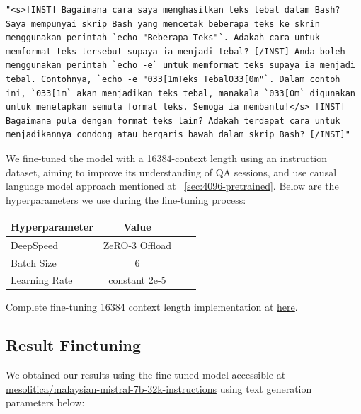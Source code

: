 \documentclass[preprint]{article}
\begin{document}
\begin{lstlisting}[breaklines=true]
"<s>[INST] Bagaimana cara saya menghasilkan teks tebal dalam Bash? Saya mempunyai skrip Bash yang mencetak beberapa teks ke skrin menggunakan perintah `echo "Beberapa Teks"`. Adakah cara untuk memformat teks tersebut supaya ia menjadi tebal? [/INST] Anda boleh menggunakan perintah `echo -e` untuk memformat teks supaya ia menjadi tebal. Contohnya, `echo -e "033[1mTeks Tebal033[0m"`. Dalam contoh ini, `033[1m` akan menjadikan teks tebal, manakala `033[0m` digunakan untuk menetapkan semula format teks. Semoga ia membantu!</s> [INST] Bagaimana pula dengan format teks lain? Adakah terdapat cara untuk menjadikannya condong atau bergaris bawah dalam skrip Bash? [/INST]"
\end{lstlisting}



We fine-tuned the model with a 16384-context length using an instruction dataset, aiming to improve its understanding of QA sessions, and use causal language model approach mentioned at ~\ref{sec:4096-pretrained}. Below are the hyperparameters we use during the fine-tuning process:

\begin{table}[h]
  \centering
  \begin{tabular}{lccl}
    \hline
    \textbf{Hyperparameter} & \textbf{Value} \\
    \hline
    DeepSpeed               & ZeRO-3 Offload \\
    Batch Size              & 6              \\
    Learning Rate           & constant 2e-5  \\

    \hline
  \end{tabular}
\end{table}

Complete fine-tuning 16384 context length implementation at \href{https://github.com/mesolitica/malaya/tree/5.1/session/mistral#instructions-7b-16384-context-length}{here}.

\subsection{Result Finetuning}\label{sec:result-finetuning}

We obtained our results using the fine-tuned model accessible at \href{https://huggingface.co/mesolitica/malaysian-mistral-7b-32k-instructions}{mesolitica/malaysian-mistral-7b-32k-instructions} using text generation parameters below:
\end{document}
